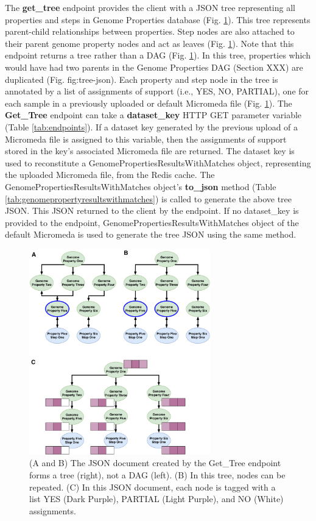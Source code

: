 The \textbf{get\_tree} endpoint provides the client with a JSON tree representing all properties and steps in Genome Properties database (Fig. \ref{fig:tree-json}). This tree represents parent-child relationships between properties. Step nodes are also attached to their parent genome property nodes and act as leaves (Fig. \ref{fig:tree-json}). Note that this endpoint returns a tree rather than a DAG (Fig. \ref{fig:tree-json}). In this tree, properties which would have had two parents in the Genome Properties DAG (Section XXX) are duplicated (Fig. fig:tree-json). Each property and step node in the tree is annotated by a list of assignments of support (i.e., YES, NO, PARTIAL), one for each sample in a previously uploaded or default Micromeda file (Fig. \ref{fig:tree-json}). The \textbf{Get\_Tree} endpoint can take a \textbf{dataset\_key} HTTP GET parameter variable (Table \ref{tab:endpoints}). If a dataset key generated by the previous upload of a Micromeda file is assigned to this variable, then the assignments of support stored in the key's associated Micromeda file are returned. The dataset key is used to reconstitute a GenomePropertiesResultsWithMatches object, representing the uploaded Micromeda file, from the Redis cache. The GenomePropertiesResultsWithMatches object's \textbf{to\_json} method (Table \ref{tab:genomepropertyresultswithmatches}) is called to generate the above tree JSON. This JSON returned to the client by the endpoint. If no dataset\_key is provided to the endpoint, GenomePropertiesResultsWithMatches object of the default Micromeda is used to generate the tree JSON using the same method.

\begin{figure}[!ht]
  \centering
	\includegraphics[width=0.70\textwidth]{media/Tree-JSON.pdf}
	 \caption{(A and B) The JSON document created by the Get\_Tree endpoint forms a tree (right), not a DAG (left). (B) In this tree, nodes can be repeated. (C) In this JSON document, each node is tagged with a list YES (Dark Purple), PARTIAL (Light Purple), and NO (White) assignments.}
	 \label{fig:tree-json}
\end{figure}


